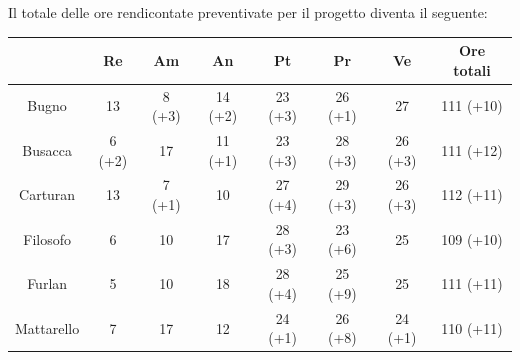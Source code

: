 \pagebreak
Il totale delle ore rendicontate preventivate per il progetto diventa il seguente:

\begin{table}[H]
  \centering
  \renewcommand{\arraystretch}{1.8}
  \begin{tabular}{c|c|c|c|c|c|c|c}
    \rowcolor[HTML]{125E28}
    \multicolumn{1}{c}{\color[HTML]{FFFFFF}\textbf{ Nominativo }}
                        & \multicolumn{1}{c}{\color[HTML]{FFFFFF}\textbf{ Re }}
                        & \multicolumn{1}{c}{\color[HTML]{FFFFFF}\textbf{ Am}}
                        & \multicolumn{1}{c}{\color[HTML]{FFFFFF}\textbf{ An }}
                        & \multicolumn{1}{c}{\color[HTML]{FFFFFF}\textbf{ Pt }}
                        & \multicolumn{1}{c}{\color[HTML]{FFFFFF}\textbf{ Pr }}
                        & \multicolumn{1}{c}{\color[HTML]{FFFFFF}\textbf{ Ve }}
                        & \multicolumn{1}{c}{\color[HTML]{FFFFFF}\textbf{ Ore totali }}                                                                                                                            \\
    \hline
    Bugno               & 13                                                            & 8 (+3)           & 14 (+2)           & 23 (+3)            & 26 (+1)            & 27                 & 111 (+10)          \\
    Busacca             & 6 (+2)                                                        & 17               & 11 (+1)           & 23 (+3)            & 28 (+3)            & 26 (+3)            & 111 (+12)          \\
    Carturan            & 13                                                            & 7 (+1)           & 10                & 27 (+4)            & 29 (+3)            & 26 (+3)            & 112 (+11)          \\
    Filosofo            & 6                                                             & 10               & 17                & 28 (+3)            & 23 (+6)            & 25                 & 109 (+10)          \\
    Furlan              & 5                                                             & 10               & 18                & 28 (+4)            & 25 (+9)            & 25                 & 111 (+11)          \\
    Mattarello          & 7                                                             & 17               & 12                & 24 (+1)            & 26 (+8)            & 24 (+1)            & 110 (+11)          \\

\end{tabular}
\end{table}
